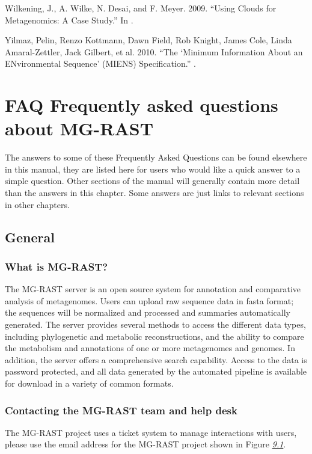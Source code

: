 \documentclass[letterpaper,10pt,english]{sphinxmanual}
\begin{document}
Wilkening, J., A. Wilke, N. Desai, and F. Meyer. 2009. “Using
Clouds for Metagenomics: A Case Study.” In .

Yilmaz, Pelin, Renzo Kottmann, Dawn Field, Rob Knight, James Cole,
Linda Amaral-Zettler, Jack Gilbert, et al. 2010. “The ‘Minimum
Information About an ENvironmental Sequence’ (MIENS)
Specification.” .


\chapter{FAQ \textendash{} Frequently asked questions about MG-RAST}
\label{\detokenize{faq:faq-frequently-asked-questions-about-mg-rast}}\label{\detokenize{faq::doc}}
The answers to some of these Frequently Asked Questions can be found
elsewhere in this manual, they are listed here for users who would like
a quick answer to a simple question. Other sections of the manual will
generally contain more detail than the answers in this chapter. Some
answers are just links to relevant sections in other chapters.


\section{General}
\label{\detokenize{faq:general}}

\subsection{What is MG-RAST?}
\label{\detokenize{faq:what-is-mg-rast}}
The MG-RAST server is an open source system for annotation and
comparative analysis of metagenomes. Users can upload raw sequence data
in fasta format; the sequences will be normalized and processed and
summaries automatically generated. The server provides several methods
to access the different data types, including phylogenetic and metabolic
reconstructions, and the ability to compare the metabolism and
annotations of one or more metagenomes and genomes. In addition, the
server offers a comprehensive search capability. Access to the data is
password protected, and all data generated by the automated pipeline is
available for download in a variety of common formats.


\subsection{Contacting the MG-RAST team and help desk}
\label{\detokenize{faq:contacting-the-mg-rast-team-and-help-desk}}\label{\detokenize{faq:section-contact-mgrast}}
The MG-RAST project uses a ticket system to manage interactions with
users, please use the email address for the MG-RAST project shown in
Figure {\hyperref[\detokenize{faq:fig:mgrastemail}]{\emph{9.1}}}.
\end{document}

